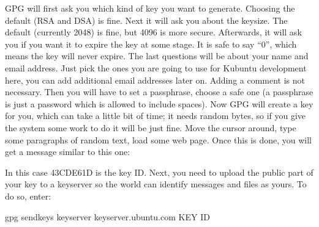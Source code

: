 \documentclass[letterpaper,10pt,english]{sphinxmanual}
\begin{document}
\sphinxAtStartPar
GPG will first ask you which kind of key you want to generate. Choosing the default (RSA and DSA) is fine. Next it will ask you about the keysize. The default (currently 2048) is fine, but 4096 is more secure. Afterwards, it will ask you if you want it to expire the key at some stage. It is safe to say “0”, which means the key will never expire. The last questions will be about your name and email address. Just pick the ones you are going to use for Kubuntu development here, you can add additional email addresses later on. Adding a comment is not necessary. Then you will have to set a passphrase, choose a safe one (a passphrase is just a password which is allowed to include spaces).
Now GPG will create a key for you, which can take a little bit of time; it needs random bytes, so if you give the system some work to do it will be just fine. Move the cursor around, type some paragraphs of random text, load some web page.
Once this is done, you will get a message similar to this one:

\begin{sphinxVerbatim}[commandchars=\\\{\}]
    
                   
     
    
\end{sphinxVerbatim}

\sphinxAtStartPar
In this case 43CDE61D is the key ID.
Next, you need to upload the public part of your key to a keyserver so the world can identify messages and files as yours. To do so, enter:

\begin{sphinxVerbatim}[commandchars=\\\{\}]
\PYGZdl{} gpg \PYGZhy{}\PYGZhy{}send\PYGZhy{}keys \PYGZhy{}\PYGZhy{}keyserver keyserver.ubuntu.com \PYGZlt{}KEY ID\PYGZgt{}
\end{sphinxVerbatim}
\end{document}
